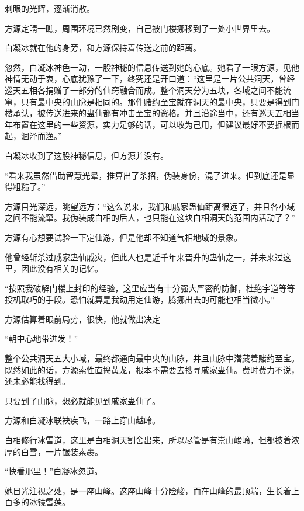 
\begin{this_body}



刺眼的光辉，逐渐消散。

方源定睛一瞧，周围环境已然剧变，自己被门楼挪移到了一处小世界里去。

白凝冰就在他的身旁，和方源保持着传送之前的距离。

忽然，白凝冰神色一动，一股神秘的信息传送到她的心底。她看了一眼方源，见他神情无动于衷，心底犹豫了一下，终究还是开口道：“这里是一片公共洞天，曾经巡天五相各捐赠了一部分的仙窍融合而成。整个洞天分为五块，各域之间不能流窜，只有最中央的山脉是相同的。那件赌约至宝就在洞天的最中央，只要是得到门楼承认，被传送进来的蛊仙都有冲击至宝的资格。并且沿途当中，还有巡天五相当年布置在这里的一些资源，实力足够的话，可以收为己用，但建议最好不要掘根而起，涸泽而渔。”

白凝冰收到了这股神秘信息，但方源并没有。

“看来我虽然借助智慧光晕，推算出了杀招，伪装身份，混了进来。但到底还是显得粗糙了。”

方源目光深远，眺望远方：“这么说来，我们和戚家蛊仙距离很远了，并且各小域之间不能流窜。我伪装成白相的后人，也只能在这块白相洞天的范围内活动了？”

方源有心想要试验一下定仙游，但是他却不知道气相地域的景象。

他曾经斩杀过戚家蛊仙戚灾，但此人也是近千年来晋升的蛊仙之一，并未来过这里，因此没有相关的记忆。

“按照我破解门楼上封印的经验，这里应当有十分强大严密的防御，杜绝宇道等等投机取巧的手段。恐怕就算是我动用定仙游，腾挪出去的可能也相当微小。”

方源估算着眼前局势，很快，他就做出决定

“朝中心地带进发！”

整个公共洞天五大小域，最终都通向最中央的山脉，并且山脉中潜藏着赌约至宝。既然如此的话，方源索性直捣黄龙，根本不需要去搜寻戚家蛊仙。费时费力不说，还未必能找得到。

只要到了山脉，想必就能见到戚家蛊仙了。

方源和白凝冰联袂疾飞，一路上穿山越岭。

白相修行冰雪道，这里是白相洞天割舍出来，所以尽管是有崇山峻岭，但都披着浓厚的白雪，一片银装素裹。

“快看那里！”白凝冰忽道。

她目光注视之处，是一座山峰。这座山峰十分险峻，而在山峰的最顶端，生长着上百多的冰镜雪莲。


\end{this_body}
